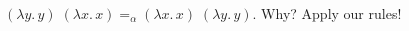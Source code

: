 \begin{frame}
  \begin{definition}
  \begin{multicols}{2}
    \begin{prooftree}
    \end{prooftree}
    \begin{prooftree}
    \end{prooftree}
    \begin{prooftree}
    \end{prooftree}
    \begin{prooftree}
    \end{prooftree}
    \begin{prooftree}
    \end{prooftree}
    \begin{prooftree}
    \end{prooftree}
  \end{multicols}
\end{definition}

  $(\lambda y.\, y)\;(\lambda x.\, x) =_\alpha (\lambda x.\,x)\;(\lambda y.\,y)$. Why? Apply our rules! 
\end{frame}

